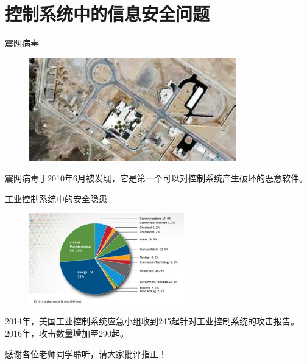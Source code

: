 \documentclass[10pt]{beamer}
\begin{document}
\section{控制系统中的信息安全问题}
\begin{frame}{震网病毒}
  \begin{figure}[ht]
    \centering
    \includegraphics[width=0.8\textwidth]{stuxnet.jpg}
  \end{figure}
  震网病毒于2010年6月被发现，它是第一个可以对控制系统产生破坏的恶意软件。
\end{frame}

\begin{frame}{工业控制系统中的安全隐患}
  \begin{figure}[ht]
    \centering
    \includegraphics[width=0.6\textwidth]{cert.jpg}
  \end{figure}
  2014年，美国工业控制系统应急小组收到245起针对工业控制系统的攻击报告。2016年，攻击数量增加至290起。
\end{frame}

\begin{frame}[standout]
  感谢各位老师同学聆听，请大家批评指正！
\end{frame}
\end{document}
